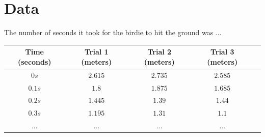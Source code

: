\documentclass[12pt]{article}
\begin{document}
\section{Data}

The number of seconds it took for the birdie to hit the ground was ...
\\


\begin{center}
\begin{tabular}{|c|c|c|c|c|} %
\hline
Time (seconds) & Trial 1 (meters) & Trial 2 (meters) & Trial 3 (meters) \\[0.5ex] %
\hline\hline
$0 s $&$ 2.615 $&$ 2.735 $&$ 2.585 $\\ %
\hline
$0.1 s $&$ 1.8 $&$ 1.875 $&$ 1.685 $\\ %
\hline
$0.2 s $&$ 1.445 $&$ 1.39 $&$ 1.44 $\\ %
\hline
$0.3 s $&$ 1.195 $&$ 1.31 $&$ 1.1 $\\ %
\hline
$ ... $&$ ... $&$ ... $&$ ... $\\ %
\hline
\end{tabular}
\end{center}
% 
%
%
%
%
\end{document}
